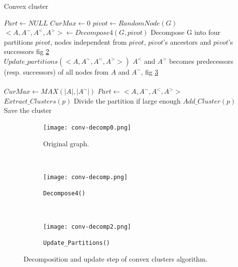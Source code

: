 \documentclass[10pt, conference, compsocconf,pdftex,dvipsnames]{IEEEtran}
\begin{document}
\begin{algorithm}[h!]
    \centering
    \caption{Convex cluster}
    \label{algo:conv-clust}
    \begin{algorithmic}[1]
        \State $Part \gets NULL$
        \State $CurMax \gets 0$
        \label{algop:main-loop}
        \State $pivot \gets RandomNode(G)$
        \State
        $<A,A^{\sim},A^<,A^>> \gets Decompose4(G,pivot)$\label{algop:init-part}
        \Comment Decompose G into four partitions 
        \Comment $pivot$, nodes independent from $pivot$, 
        \Comment $pivot$'s ancestors and $pivot$'s successors fig
        \ref{fig:conv-decomp1} 
        \\
        \State $Update\_partitions(<A,A^{\sim},A^<,A^>>)$
        \label{algop:update-part}
        \Comment $A^<$ and $A^>$ becomes predecessors 
        \Comment (resp. successors) of all nodes  
        \Comment from $A$ and $A^{\sim}$, fig 
        \ref{fig:conv-decomp2}
        \\
         \label{algop:part-choice}
        \\
        \State $CurMax \gets MAX(|A|,|A^{\sim}|)$
        \State $Part \gets <A,A^{\sim},A^<,A^>>$
        \EndIf
        \EndFor
        \label{algop:rec-stop}
        \State $Extract\_Clusters(p)$
        \Comment Divide the partition if large enough
        \Else
        \State $Add\_Cluster(p)$
        \Comment Save the cluster
        \EndIf
        \EndFor
        \EndFunction
    \end{algorithmic}
\end{algorithm}

\begin{figure}[t!]
    \centering
    \begin{subfigure}{0.22\textwidth}
        \centering
        \texttt{[image: conv-decomp0.png]}
        \caption{Original graph.}
        \label{fig:conv-decomp0}
    \end{subfigure}
    ~
    \begin{subfigure}{0.25\textwidth}
        \centering
        \texttt{[image: conv-decomp.png]}
        \caption{\texttt{Decompose4()}}
        \label{fig:conv-decomp1}
    \end{subfigure}
    ~
    \begin{subfigure}{0.25\textwidth}
        \centering
        \texttt{[image: conv-decomp2.png]}
        \caption{\texttt{Update\_Partitions()}}
        \label{fig:conv-decomp2}
    \end{subfigure}
    \caption{Decomposition and update step of convex clusters algorithm.}
    \label{fig:conv-decomp}
\end{figure}
\end{document}
